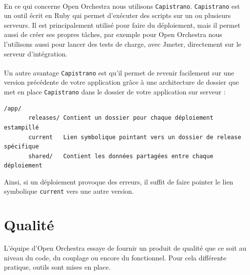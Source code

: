 \paragraph{}
En ce qui concerne Open Orchestra nous utilisons \verb?Capistrano?. \verb?Capistrano? est un outil écrit en Ruby qui permet d'exécuter des scripts sur un ou plusieurs serveurs. Il est principalement utilisé pour faire du déploiement, mais il permet aussi de créer ses propres tâches, par exemple pour Open Orchestra nous l'utilisons aussi pour lancer des tests de charge, avec Jmeter, directement sur le serveur d'intégration.
\paragraph{}
Un autre avantage \verb?Capistrano? est qu'il permet de revenir facilement sur une version précédente de votre application grâce à une architecture de dossier que met en place \verb?Capistrano? dans le dossier de votre application sur serveur : 
\begin{verbatim}
/app/
       releases/ Contient un dossier pour chaque déploiement estampillé
       current   Lien symbolique pointant vers un dossier de release spécifique
       shared/   Contient les données partagées entre chaque déploiement
\end{verbatim}
Ainsi, si un déploiement provoque des erreurs, il suffit de faire pointer le lien symbolique \verb?current? vers une autre version.

\section{Qualité}
L'équipe d'Open Orchestra essaye de fournir un produit de qualité que ce soit au niveau du code, du couplage ou encore du fonctionnel. Pour cela différente pratique, outils sont mises en place.
